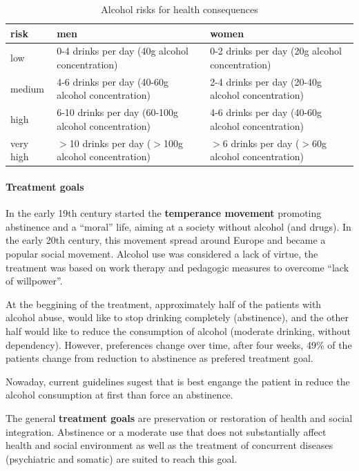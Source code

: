 \documentclass[12pt,article,oneside,a4paper]{memoir}
\begin{document}
\begin{table}
  \begin{tabular}{ p{4cm} | p{5cm} | p{5cm} }
    \hline
    risk & men & women \\ \hline
	\hline
    low & 0-4 drinks per day (40g alcohol concentration) & 0-2 drinks per day (20g alcohol concentration) \\ \hline
    medium & 4-6 drinks per day (40-60g alcohol concentration) & 2-4 drinks per day (20-40g alcohol concentration) \\ \hline
    high & 6-10 drinks per day (60-100g alcohol concentration) & 4-6 drinks per day (40-60g alcohol concentration) \\ \hline
    very high & $>$10 drinks per day ($>$100g alcohol concentration) & $>$6 drinks per day ($>$60g alcohol concentration) \\ 
    \hline
  \end{tabular}
  \caption{Alcohol risks for health consequences}
  \label{table:alcohol-risks}
\end{table}

\paragraph{Treatment goals} 
In the early 19th century started the \textbf{temperance movement} promoting abstinence and a ``moral'' life, aiming at a society without alcohol (and drugs). In the early 20th century, this movement spread around Europe and became a popular social movement. Alcohol use was considered a lack of virtue, the treatment was based on work therapy and pedagogic measures to overcome ``lack of willpower''.

At the beggining of the treatment, approximately half of the patients with alcohol abuse, would like to stop drinking completely (abstinence), and the other half would like to reduce the consumption of alcohol (moderate drinking, without dependency). However, preferences change over time, after four weeks, 49\% of the patients change from reduction to abstinence as prefered treatment goal.

Nowaday, current guidelines sugest that is best engange the patient in reduce the alcohol consumption at first than force an abstinence.

The general \textbf{treatment goals} are preservation or restoration of health and social integration. Abstinence or a moderate use that does not substantially affect health and social environment as well as the treatment of concurrent diseases (psychiatric and somatic) are suited to reach this goal.
\end{document}
